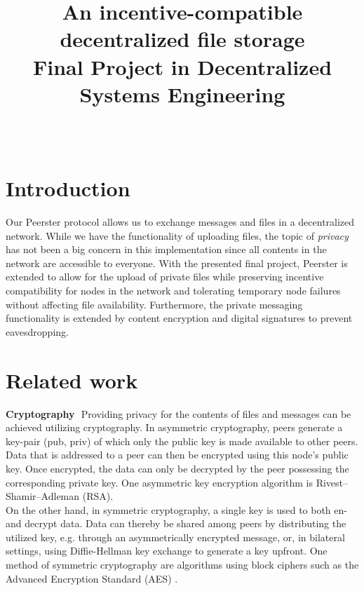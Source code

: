 \documentclass{article}
\title{
\vspace{-10mm}\fontsize{19pt}{10pt}\selectfont
\textbf{An incentive-compatible decentralized file storage}\\
\vspace{0.5em}\fontsize{12pt}{10pt}\selectfont
\textbf{Final Project in Decentralized Systems Engineering}\\
\vspace{0.7em}\fontsize{12pt}{10pt}\selectfont
\text{Carolin Beer, SCIPER Nr. 294852}\\
\vspace{-4ex}
}
\author{}
\date{}
\begin{document}

\maketitle %
\thispagestyle{fancy} %
\newcommand{\elem}[1]{\noindent\textbf{#1}\,\,}
\section*{Introduction}
Our Peerster protocol allows us to exchange messages and files in a decentralized network. While we have the functionality of uploading files, the topic of \emph{privacy} has not been a big concern in this implementation since all contents in the network are accessible to everyone.
With the presented final project, Peerster is extended to allow for the upload of private files while preserving incentive compatibility for nodes in the network and tolerating temporary node failures without affecting file availability. Furthermore, the private messaging functionality is extended by content encryption and digital signatures to prevent eavesdropping.

\section*{Related work}
\elem{Cryptography}
Providing privacy for the contents of files and messages can be achieved utilizing cryptography. In asymmetric cryptography, peers generate a key-pair (pub, priv) of which only the public key is made available to other peers. Data that is addressed to a peer can then be encrypted using this node's public key. Once encrypted, the data can only be decrypted by the peer possessing the corresponding private key. One asymmetric key encryption algorithm is Rivest–Shamir–Adleman (RSA).\\
On the other hand, in symmetric cryptography, a single key is used to both en- and decrypt data. Data can thereby be shared among peers by distributing the utilized key, e.g. through an asymmetrically encrypted message, or, in bilateral settings, using Diffie-Hellman key exchange to generate a key upfront. One method of symmetric cryptography are algorithms using block ciphers such as the Advanced Encryption Standard (AES) \citep{Smart.2002}.
\\\vspace{0.5em}
\end{document}

